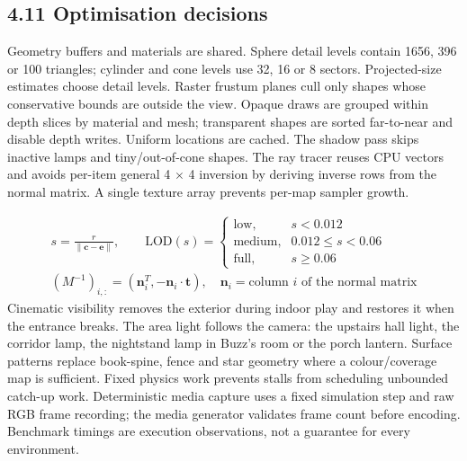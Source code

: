 \documentclass[12pt,a4paper]{article}
\begin{document}
\subsection*{4.11 Optimisation decisions}
Geometry buffers and materials are shared. Sphere detail levels contain 1656, 396 or 100 triangles; cylinder and cone levels use 32, 16 or 8 sectors. Projected-size estimates choose detail levels. Raster frustum planes cull only shapes whose conservative bounds are outside the view. Opaque draws are grouped within depth slices by material and mesh; transparent shapes are sorted far-to-near and disable depth writes. Uniform locations are cached. The shadow pass skips inactive lamps and tiny/out-of-cone shapes. The ray tracer reuses CPU vectors and avoids per-item general 4 \(\times\) 4 inversion by deriving inverse rows from the normal matrix. A single texture array prevents per-map sampler growth.

{\small\begin{equation}\begin{gathered}
s=\frac{r}{\|\mathbf c-\mathbf e\|},\qquad
\mathrm{LOD}(s)=\begin{cases}\text{low},&s<0.012\\\text{medium},&0.012\le s<0.06\\\text{full},&s\ge0.06\end{cases}\\
(M^{-1})_{i,:}=(\mathbf n_i^T,-\mathbf n_i\cdot\mathbf t),\quad
\mathbf n_i=\text{column }i\text{ of the normal matrix}
\end{gathered}\label{eq:33}\end{equation}}
Cinematic visibility removes the exterior during indoor play and restores it when the entrance breaks. The area light follows the camera: the upstairs hall light, the corridor lamp, the nightstand lamp in Buzz's room or the porch lantern. Surface patterns replace book-spine, fence and star geometry where a colour/coverage map is sufficient. Fixed physics work prevents stalls from scheduling unbounded catch-up work. Deterministic media capture uses a fixed simulation step and raw RGB frame recording; the media generator validates frame count before encoding. Benchmark timings are execution observations, not a guarantee for every environment.
\end{document}
